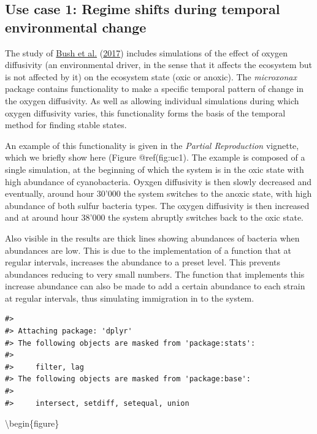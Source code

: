 \documentclass[]{elsarticle} %
\begin{document}
\hypertarget{use-case-1-regime-shifts-during-temporal-environmental-change}{%
\subsection{Use case 1: Regime shifts during temporal environmental
change}\label{use-case-1-regime-shifts-during-temporal-environmental-change}}

The study of \protect\hyperlink{ref-Bush2017}{Bush et al.}
(\protect\hyperlink{ref-Bush2017}{2017}) includes simulations of the
effect of oxygen diffusivity (an environmental driver, in the sense that
it affects the ecosystem but is not affected by it) on the ecosystem
state (oxic or anoxic). The \emph{microxonax} package contains
functionality to make a specific temporal pattern of change in the
oxygen diffusivity. As well as allowing individual simulations during
which oxygen diffusivity varies, this functionality forms the basis of
the temporal method for finding stable states.

An example of this functionality is given in the \emph{Partial
Reproduction} vignette, which we briefly show here (Figure
@ref(fig:uc1). The example is composed of a single simulation, at the
beginning of which the system is in the oxic state with high abundance
of cyanobacteria. Oyxgen diffusivity is then slowly decreased and
eventually, around hour 30'000 the system switches to the anoxic state,
with high abundance of both sulfur bacteria types. The oxygen
diffusivity is then increased and at around hour 38'000 the system
abruptly switches back to the oxic state.

Also visible in the results are thick lines showing abundances of
bacteria when abundances are low. This is due to the implementation of a
function that at regular intervals, increases the abundance to a preset
level. This prevents abundances reducing to very small numbers. The
function that implements this increase abundance can also be made to add
a certain abundance to each strain at regular intervals, thus simulating
immigration in to the system.

\begin{verbatim}
#> 
#> Attaching package: 'dplyr'
#> The following objects are masked from 'package:stats':
#> 
#>     filter, lag
#> The following objects are masked from 'package:base':
#> 
#>     intersect, setdiff, setequal, union
\end{verbatim}

\textbackslash begin\{figure\}
\end{document}
